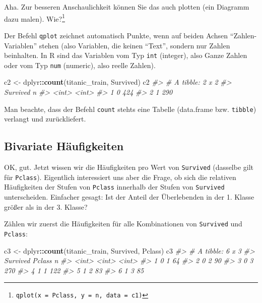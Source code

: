 \documentclass[12pt,ngerman,]{book}
\makeatletter
\newenvironment{Shaded}{\begin{snugshade}}{\end{snugshade}}
\newcommand{\KeywordTok}[1]{\textcolor[rgb]{0.13,0.29,0.53}{\textbf{#1}}}
\newcommand{\StringTok}[1]{\textcolor[rgb]{0.31,0.60,0.02}{#1}}
\newcommand{\CommentTok}[1]{\textcolor[rgb]{0.56,0.35,0.01}{\textit{#1}}}
\newcommand{\OperatorTok}[1]{\textcolor[rgb]{0.81,0.36,0.00}{\textbf{#1}}}
\newcommand{\NormalTok}[1]{#1}
\let\rmarkdownfootnote\footnote%
\def\footnote{\protect\rmarkdownfootnote}
\newenvironment{kframe}{%
\medskip{}
\setlength{\fboxsep}{.8em}
 \def\at@end@of@kframe{}%
 \ifinner\ifhmode%
  \def\at@end@of@kframe{\end{minipage}}%
  \begin{minipage}{\columnwidth}%
 \fi\fi%
 \def\FrameCommand##1{\hskip\@totalleftmargin \hskip-\fboxsep
 \colorbox{shadecolor}{##1}\hskip-\fboxsep
     \hskip-\linewidth \hskip-\@totalleftmargin \hskip\columnwidth}%
 \MakeFramed {\advance\hsize-\width
   \@totalleftmargin\z@ \linewidth\hsize
   \@setminipage}}%
 {\par\unskip\endMakeFramed%
 \at@end@of@kframe}
\renewenvironment{Shaded}{\begin{kframe}}{\end{kframe}}
\theoremstyle{definition}
\theoremstyle{definition}
\theoremstyle{remark}
\makeatother
\begin{document}
Aha. Zur besseren Anschaulichkeit können Sie das auch plotten (ein
Diagramm dazu malen). Wie?\footnote{\texttt{qplot(x\ =\ Pclass,\ y\ =\ n,\ data\ =\ c1)}}

Der Befehl \texttt{qplot} zeichnet automatisch Punkte, wenn auf beiden
Achsen ``Zahlen-Variablen'' stehen (also Variablen, die keinen ``Text'',
sondern nur Zahlen beinhalten. In R sind das Variablen vom Typ
\texttt{int} (integer), also Ganze Zahlen oder vom Typ \texttt{num}
(numeric), also reelle Zahlen).

\begin{Shaded}
\begin{Highlighting}[]
\NormalTok{c2 <-}\StringTok{ }\NormalTok{dplyr}\OperatorTok{::}\KeywordTok{count}\NormalTok{(titanic_train, Survived)}
\NormalTok{c2}
\CommentTok{#> # A tibble: 2 x 2}
\CommentTok{#>   Survived     n}
\CommentTok{#>      <int> <int>}
\CommentTok{#> 1        0   424}
\CommentTok{#> 2        1   290}
\end{Highlighting}
\end{Shaded}

Man beachte, dass der Befehl \texttt{count} stehts eine Tabelle
(data.frame bzw. \texttt{tibble}) verlangt und zurückliefert.

\subsection{Bivariate Häufigkeiten}\label{bivariate-haufigkeiten}

OK, gut. Jetzt wissen wir die Häufigkeiten pro Wert von
\texttt{Survived} (dasselbe gilt für \texttt{Pclass}). Eigentlich
interessiert uns aber die Frage, ob sich die relativen Häufigkeiten der
Stufen von \texttt{Pclass} innerhalb der Stufen von \texttt{Survived}
unterscheiden. Einfacher gesagt: Ist der Anteil der Überlebenden in der
1. Klasse größer als in der 3. Klasse?

Zählen wir zuerst die Häufigkeiten für alle Kombinationen von
\texttt{Survived} und \texttt{Pclass}:

\begin{Shaded}
\begin{Highlighting}[]
\NormalTok{c3 <-}\StringTok{ }\NormalTok{dplyr}\OperatorTok{::}\KeywordTok{count}\NormalTok{(titanic_train, Survived, Pclass)}
\NormalTok{c3}
\CommentTok{#> # A tibble: 6 x 3}
\CommentTok{#>   Survived Pclass     n}
\CommentTok{#>      <int>  <int> <int>}
\CommentTok{#> 1        0      1    64}
\CommentTok{#> 2        0      2    90}
\CommentTok{#> 3        0      3   270}
\CommentTok{#> 4        1      1   122}
\CommentTok{#> 5        1      2    83}
\CommentTok{#> 6        1      3    85}
\end{Highlighting}
\end{Shaded}
\end{document}
